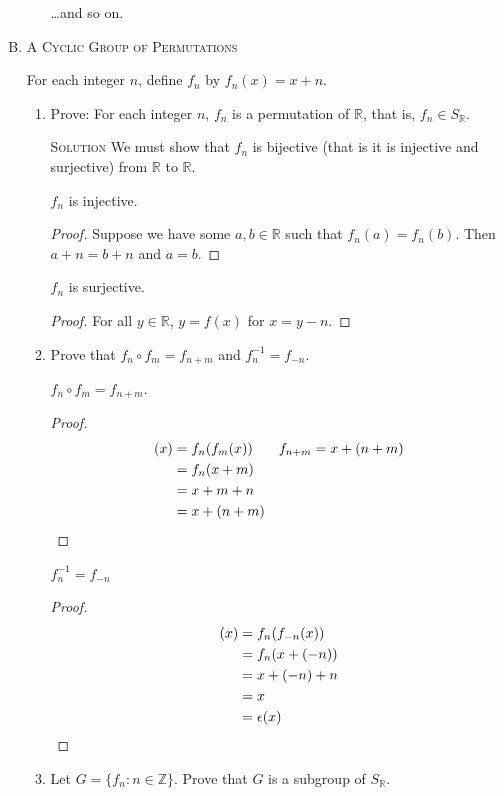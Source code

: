 \documentclass[twoside]{amsart}
\newcommand{\Reals}{\ensuremath{\mathbb{R}}\xspace}
\newcommand{\Integers}{\mathbb{Z}{}}
\newcommand{\solution}{\textsc{Solution}\xspace}
\newcommand{\eps}{\ensuremath{\epsilon}\xspace}
\begin{document}
\begin{enumerate}[A.]
\begin{enumerate}[1]
      \dots and so on.
   \end{enumerate}

   \item \textsc{A Cyclic Group of Permutations}

   \noindent For each integer $n$, define $f_n$ by $f_n(x)=x+n$.
   \begin{enumerate}[1]
      \item Prove: For each integer $n$, $f_n$ is a permutation of \Reals,
      that is, $f_n \in S_{\mathbb{R}}$.

      \solution We must show that $f_n$ is bijective (that is it is
       injective and surjective) from \Reals to \Reals.

      $f_n$ is injective. 
      \begin{proof}
         Suppose we have some $a,b \in \Reals$ such that
	  $f_n(a)=f_n(b)$. Then $a+n=b+n$ and $a=b$.
      \end{proof}
      $f_n$ is surjective.
      \begin{proof}
         For all $y \in \Reals$, $y=f(x)$ for $x=y-n$.
      \end{proof}

      \item Prove that $f_n \circ f_m = f_{n+m}$ and $f_n^{-1} = f_{-n}$.

      $f_n \circ f_m = f_{n+m}$.
      \begin{proof}
      \begin{align*}
          [f_n \circ f_m](x) &= f_n(f_m(x)) & f_{n+m} &= x + (n+m) \\
	                     &= f_n(x + m) \\
			     &= x + m + n \\
			     &= x + (n+m) \qedhere
      \end{align*}
      \end{proof}
      $f_n^{-1} = f_{-n}$
      \begin{proof}
      \begin{align*}
         [f_n \circ f_{-n}](x) &= f_n(f_{-n}(x)) \\
	                       &= f_n(x + (-n))  \\
			       &= x + (-n) + n \\
			       &= x \\
			       &= \eps(x) \qedhere
      \end{align*}
      \end{proof}

      \item Let $G=\{f_n : n \in \Integers\}$. Prove that $G$ is a subgroup
      of $S_{\Reals}$.


\end{enumerate}
\end{enumerate}
\end{document}
